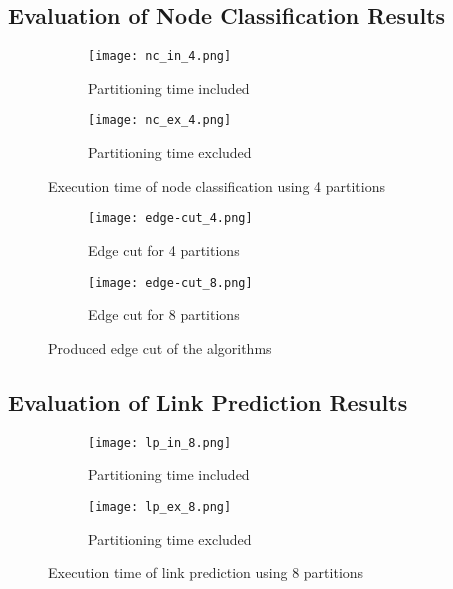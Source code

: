 \documentclass[acmsmall,nonacm,screen,review]{acmart}
\begin{document}
\subsection{Evaluation of Node Classification Results}
\begin{figure}[bt!]
     \centering
     \begin{subfigure}[b]{0.45\textwidth}
         \centering
         \texttt{[image: nc\_in\_4.png]}
         \caption{Partitioning time included}
         \label{nc_in_4}
     \end{subfigure}
     \hfill
     \begin{subfigure}[b]{0.45\textwidth}
         \centering
         \texttt{[image: nc\_ex\_4.png]}
         \caption{Partitioning time excluded}
         \label{nc_ex_4}
     \end{subfigure}
     \caption{Execution time of node classification using 4 partitions}
     \label{nc_results}
\end{figure}
\begin{figure}[bt!]
     \centering
     \begin{subfigure}[b]{0.45\textwidth}
         \centering
         \texttt{[image: edge-cut\_4.png]}
         \caption{Edge cut for 4 partitions}
         \label{cut_4}
     \end{subfigure}
     \hfill
     \begin{subfigure}[b]{0.45\textwidth}
         \centering
         \texttt{[image: edge-cut\_8.png]}
         \caption{Edge cut for 8 partitions}
         \label{cut_8}
     \end{subfigure}
     \caption{Produced edge cut of the algorithms}
     \label{cut}
\end{figure}

\subsection{Evaluation of Link Prediction Results}
\begin{figure}[bt!]
     \centering
     \begin{subfigure}[b]{0.45\textwidth}
         \centering
         \texttt{[image: lp\_in\_8.png]}
         \caption{Partitioning time included}
         \label{lp_in_4}
     \end{subfigure}
     \hfill
     \begin{subfigure}[b]{0.45\textwidth}
         \centering
         \texttt{[image: lp\_ex\_8.png]}
         \caption{Partitioning time excluded}
         \label{lp_ex_4}
     \end{subfigure}
     \caption{Execution time of link prediction using 8 partitions}
     \label{lp_results}
\end{figure}
\end{document}
